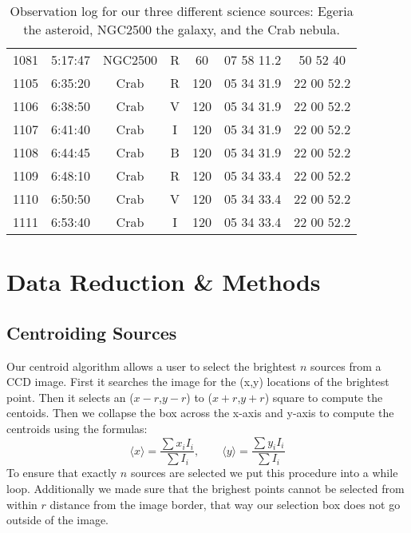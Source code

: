 \documentclass[preprint]{aastex62}
\begin{document}
\begin{table}[]
\begin{center}
\begin{tabular}{|c|c|c|c|c|c|c|}
1081      & 5:17:47  & NGC2500   & R      & 60            & 07 58 11.2 & 50 52 40   \\
1105      & 6:35:20  & Crab      & R      & 120           & 05 34 31.9 & 22 00 52.2 \\
1106      & 6:38:50  & Crab      & V      & 120           & 05 34 31.9 & 22 00 52.2 \\
1107      & 6:41:40  & Crab      & I      & 120           & 05 34 31.9 & 22 00 52.2 \\
1108      & 6:44:45  & Crab      & B      & 120           & 05 34 31.9 & 22 00 52.2 \\
1109      & 6:48:10  & Crab      & R      & 120           & 05 34 33.4 & 22 00 52.2 \\
1110      & 6:50:50  & Crab      & V      & 120           & 05 34 33.4 & 22 00 52.2 \\
1111      & 6:53:40  & Crab      & I      & 120           & 05 34 33.4 & 22 00 52.2 \\
\hline
\end{tabular}
\caption{Observation log for our three different science sources: Egeria the asteroid, NGC2500 the galaxy, and the Crab nebula.}
\end{center}
\end{table}



\section{Data Reduction \& Methods} \label{sec:methods}
\subsection{Centroiding Sources} \label{subsec:centroid_method}

Our centroid algorithm allows a user to select the brightest $n$ sources from a CCD image. First it searches the image for the (x,y) locations of the brightest point. Then it selects an ($x-r$,$y-r$) to ($x+r$,$y+r$) square to compute the centoids. Then we collapse the box across the x-axis and y-axis to compute the centroids using the formulas:
\begin{equation}
    \langle x \rangle = \frac{\sum x_i I_i}{\sum I_i}, \qquad
    \langle y \rangle = \frac{\sum y_i I_i}{\sum I_i}
\end{equation}
To ensure that exactly $n$ sources are selected we put this procedure into a while loop. Additionally we made sure that the brighest points cannot be selected from within $r$ distance from the image border, that way our selection box does not go outside of the image.
\end{document}
